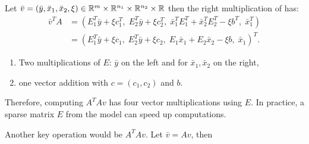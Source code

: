 \documentclass[12pt]{report}
\begin{document}
            Let $\bar v = (\bar y, \bar x_1, \bar x_2, \xi) \in \mathbb R^m\times \mathbb R^{n_1} \times \mathbb R^{n_2}\times \mathbb R$ then the right multiplication of has: 
            \begin{align*}
                \bar v^TA  &= (
                    E_1^T\bar y + \xi c_1^T,\; E_2^T\bar y + \xi c_2^T,\; 
                    \bar x_1^TE_1^T + \bar x_2^TE_2^T - \xi b^T,\; \bar x_1^T
                )
                \\
                &= 
                (
                    E_1^T\bar y + \xi c_1, \;
                    E_2^T \bar y + \xi c_2, \;
                    E_1\bar x_1 + E_2\bar x_2 - \xi b, \;
                    \bar x_1
                )^T. 
            \end{align*}
            \begin{enumerate}
                \item Two multiplications of $E$: $\bar y$ on the left and for $\bar x_1, \bar x_2$ on the right, 
                \item one vector addition with $c = (c_1, c_2)$ and $b$. 
            \end{enumerate}
            Therefore, computing $A^TAv$ has four vector multiplications using $E$. 
            In practice, a sparse matrix $E$ from the model can speed up computations. 
            \par
            Another key operation would be $A^TAv$. 
            Let $\bar v = Av$, then 
\end{document}
